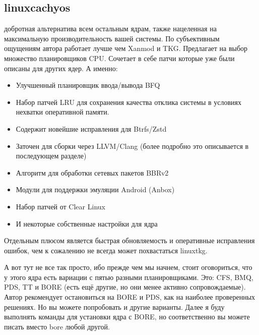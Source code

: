 \documentclass[letterpaper,10pt,russian,openany]{sphinxmanual}
\begin{document}
\subsection{linux\sphinxhyphen{}cachyos}
\label{\detokenize{source/custom-kernels:linux-cachyos}}\label{\detokenize{source/custom-kernels:index-5}}\label{\detokenize{source/custom-kernels:id7}}
\sphinxAtStartPar
{} \sphinxhyphen{} добротная альтернатива
всем остальным ядрам, также нацеленная на максимальную производительность вашей системы.
По субъективным ощущениям автора работает лучше чем Xanmod и TKG. Предлагает на выбор множество
планировщиков CPU. Сочетает в себе патчи которые уже были описаны для других ядер. А именно:
\begin{itemize}
\item {} 
\sphinxAtStartPar
Улучшенный планировщик ввода/вывода BFQ

\item {} 
\sphinxAtStartPar
Набор патчей LRU для сохранения качества отклика системы в условиях нехватки оперативной памяти.

\item {} 
\sphinxAtStartPar
Содержит новейшие исправления для Btrfs/Zstd

\item {} 
\sphinxAtStartPar
Заточен для сборки через LLVM/Clang (более подробно это описывается в последующем разделе)

\item {} 
\sphinxAtStartPar
Алгоритм для обработки сетевых пакетов BBRv2

\item {} 
\sphinxAtStartPar
Модули для поддержки эмуляции Android (Anbox)

\item {} 
\sphinxAtStartPar
Набор патчей от Clear Linux

\item {} 
\sphinxAtStartPar
И некоторые собственные настройки для ядра

\end{itemize}

\sphinxAtStartPar
Отдельным плюсом является быстрая обновляемость и оперативные исправления ошибок,
чем к сожалению не всегда может похвастаться linux\sphinxhyphen{}tkg.

\sphinxAtStartPar
{}

\sphinxAtStartPar
А вот тут не все так просто, ибо прежде чем мы начнем, стоит оговориться,
что у этого ядра есть вариации с пятью разными планировщиками. Это: CFS,
BMQ, PDS, TT и BORE (есть ещё другие, но они менее активно сопровождаемые).
Автор рекомендует остановиться на BORE и PDS, как на наиболее проверенных
решениях. Но вы можете попробовать и другие варианты. Далее я буду выполнять
команды для установки ядра с BORE, но соответственно вы можете писать вместо bore
любой другой.
\end{document}
